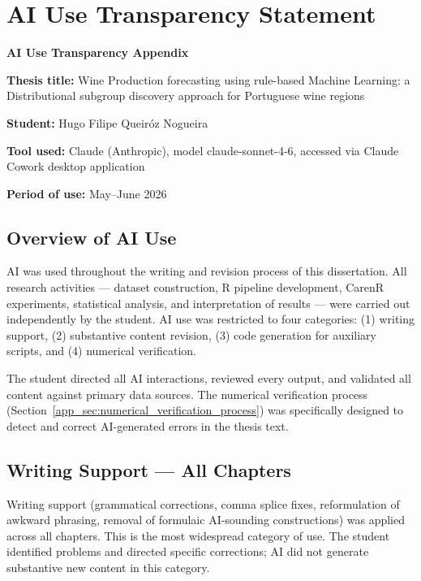 \chapter{AI Use Transparency Statement}\label{app:ai_use_transparency_statement}

\textbf{AI Use Transparency Appendix}

\textbf{Thesis title: }Wine Production forecasting using rule-based Machine Learning: a Distributional subgroup discovery approach for Portuguese wine regions

\textbf{Student: }Hugo Filipe Queir\'oz Nogueira

\textbf{Tool used: }Claude (Anthropic), model claude-sonnet-4-6, accessed via Claude Cowork desktop application

\textbf{Period of use: }May--June 2026


\section{Overview of AI Use}\label{app_sec:overview_of_ai_use}

AI was used throughout the writing and revision process of this dissertation. All research activities --- dataset construction, R pipeline development, CarenR experiments, statistical analysis, and interpretation of results --- were carried out independently by the student. AI use was restricted to four categories: (1) writing support, (2) substantive content revision, (3) code generation for auxiliary scripts, and (4) numerical verification.

The student directed all AI interactions, reviewed every output, and validated all content against primary data sources. The numerical verification process (Section~\ref{app_sec:numerical_verification_process}) was specifically designed to detect and correct AI-generated errors in the thesis text.


\section{Writing Support --- All Chapters}\label{app_sec:writing_support_all_chapters}

Writing support (grammatical corrections, comma splice fixes, reformulation of awkward phrasing, removal of formulaic AI-sounding constructions) was applied across all chapters. This is the most widespread category of use. The student identified problems and directed specific corrections; AI did not generate substantive new content in this category.

